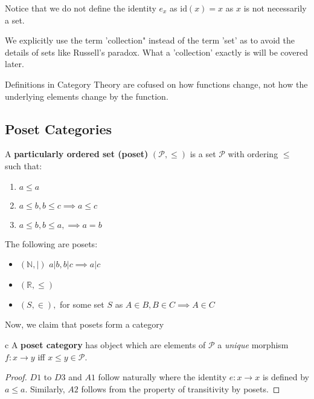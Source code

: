 \begin{remark}
    Notice that we do not define the identity $e_x$ as $\text{id}(x) = x$ as $x$ is not necessarily a set. 
\end{remark}

\begin{remark}
    We explicitly use the term 'collection" instead of the term 'set' as to avoid the details of sets like Russell's paradox. What a 'collection' exactly is will be covered later.
\end{remark}
\begin{idea}
    Definitions in Category Theory are cofused on how functions change, not how the underlying elements change by the function.
\end{idea}

\subsection{Poset Categories}
\begin{definition}
A \textbf{particularly ordered set (poset)} $(\mathcal{P}, \le)$ is a set $\mathcal{P}$ with ordering $\le$ such that:
\begin{enumerate} [label=\arabic*\textrangle]
    \item $a\le a$
    \item $a\le b, b\le c \implies a \le c$
    \item $a\le b, b\le a, \implies a = b$
\end{enumerate}
\begin{example}
The following are posets:
\begin{itemize}
    \item $(\mathbb{N}, |)$ $  a|b, b|c \implies a|c$
    \item $(\mathbb{R}, \le)$
    \item $(S, \in),$ for some set $S$ as $A\in B, B\in C \implies A\in C$
\end{itemize}
\end{example}
\end{definition}

Now, we claim that posets form a category
\begin{definition} c
A \textbf{poset category} has object which are elements of $\mathcal{P}$ a \textit{unique} morphism $f:x\to y$ iff $x\le y \in \mathcal{P}.$
    
\end{definition}

\begin{proof}
$D1$ to $D3$ and $A1$ follow naturally where the identity $e: x\to x$ is defined by $a \le a.$ Similarly, $A2$ follows from the property of transitivity by posets.     
\end{proof}

